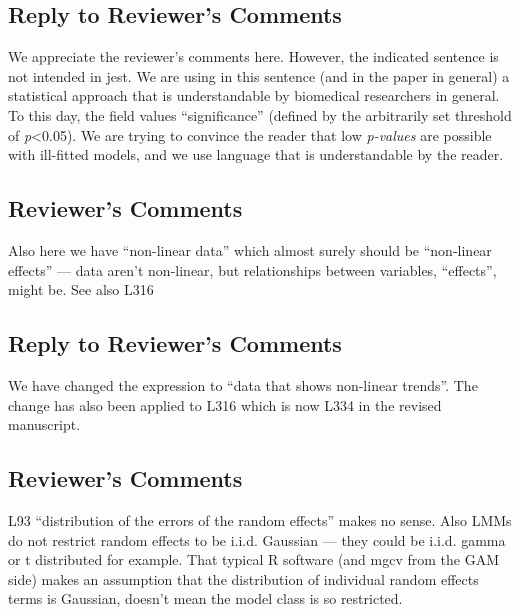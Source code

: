 \documentclass[
]{article}
\begin{document}
\hypertarget{section-16}{%
\subsection{\texorpdfstring{\textcolor{reviewersblue} {Reply to Reviewer's Comments}}{}}\label{section-16}}

We appreciate the reviewer's comments here. However, the indicated sentence is not intended in jest. We are using in this sentence (and in the paper in general) a statistical approach that is understandable by biomedical researchers in general. To this day, the field values ``significance'' (defined by the arbitrarily set threshold of \emph{p}\textless0.05). We are trying to convince the reader that low \emph{p-values} are possible with ill-fitted models, and we use language that is understandable by the reader.

\hypertarget{reviewers-comments-16}{%
\subsection{Reviewer's Comments}\label{reviewers-comments-16}}

Also here we have ``non-linear data'' which almost surely should be ``non-linear effects'' --- data aren't non-linear, but relationships between variables, ``effects'', might be. See also L316

\hypertarget{section-17}{%
\subsection{\texorpdfstring{\textcolor{reviewersblue} {Reply to Reviewer's Comments}}{}}\label{section-17}}

We have changed the expression to ``data that shows non-linear trends''. The change has also been applied to L316 which is now L334 in the revised manuscript.

\hypertarget{reviewers-comments-17}{%
\subsection{Reviewer's Comments}\label{reviewers-comments-17}}

L93 ``distribution of the errors of the random effects'' makes no sense. Also LMMs do not restrict random effects to be i.i.d. Gaussian --- they could be i.i.d. gamma or t distributed for example. That typical R software (and mgcv from the GAM side) makes an assumption that the distribution of individual random effects terms is Gaussian, doesn't mean the model class is so restricted.
\end{document}

